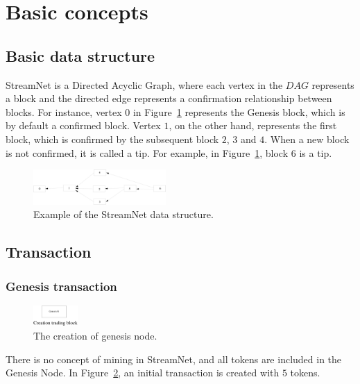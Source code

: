 \section{Basic concepts}
\subsection{Basic data structure}
StreamNet is a Directed Acyclic Graph, where each vertex in the $DAG$ represents a block and the directed edge represents a confirmation relationship between blocks.
For instance, vertex $0$ in Figure~\ref{simple_sn} represents the Genesis block, which is by default a confirmed block.
Vertex $1$, on the other hand, represents the first block, which is confirmed by the subsequent block $2$, $3$ and $4$. 
When a new block is not confirmed, it is called a tip. For example, in Figure~\ref{simple_sn}, block $6$ is a tip.

\begin{figure}[!ht]
\begin{center}
\includegraphics[width=0.45\textwidth]{figures/simple_sn.eps}
    \caption{
        Example of the StreamNet data structure.
     }
\label{simple_sn}
\end{center}
\end{figure}



\subsection{Transaction}
\subsubsection{Genesis transaction}

\begin{figure}[!ht]
\begin{center}
\includegraphics[width=0.15\textwidth]{figures/genesis.eps}
    \caption{
        The creation of genesis node.
     }
\label{genesis}
\end{center}
\end{figure}

There is no concept of mining in StreamNet, and all tokens are included in the Genesis Node.
In Figure~\ref{genesis}, an initial transaction is created with $5$ tokens.


